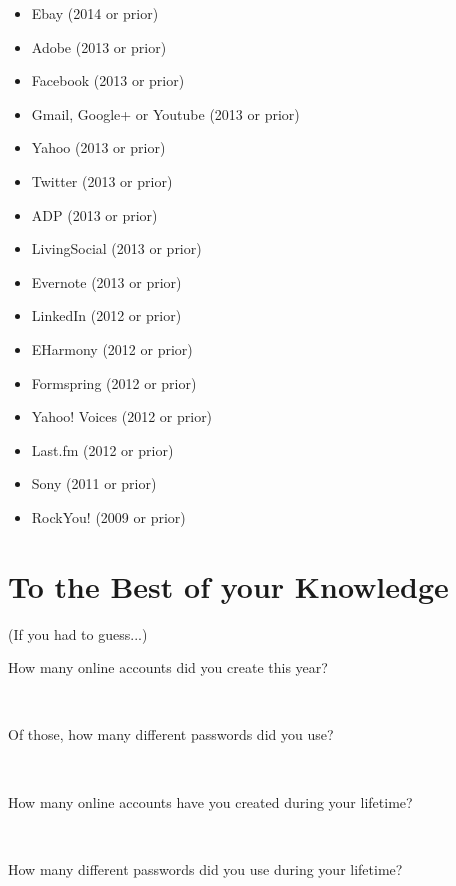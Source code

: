 \documentclass{article}
\begin{document}
\begin{description}
\begin{itemize}
          \item Ebay (2014 or prior)
          \item Adobe (2013 or prior)
          \item Facebook (2013 or prior)
          \item Gmail, Google+ or Youtube (2013 or prior)
          \item Yahoo (2013 or prior)
          \item Twitter (2013 or prior)
          \item ADP (2013 or prior)
          \item LivingSocial (2013 or prior)
          \item Evernote (2013 or prior)
          \item LinkedIn (2012 or prior)
          \item EHarmony (2012 or prior)
          \item Formspring (2012 or prior)
          \item Yahoo! Voices (2012 or prior)
          \item Last.fm (2012 or prior)
          \item Sony (2011 or prior)
          \item RockYou! (2009 or prior)
        \end{itemize}
    \end{description}
  \section{To the Best of your Knowledge}
    {\small (If you had to guess...)}
  \begin{description}
    \item[How many online accounts did you create this year?] \mbox{}\\ \underline{\hspace{10cm}}
    \item[Of those, how many different passwords did you use?] \mbox{}\\ \underline{\hspace{10cm}}
    \item[How many online accounts have you created during your lifetime?] \mbox{}\\ \underline{\hspace{10cm}}
    \item[How many different passwords did you use during your lifetime?] \mbox{}\\ \underline{\hspace{10cm}}
  \end{description}
\end{document}
